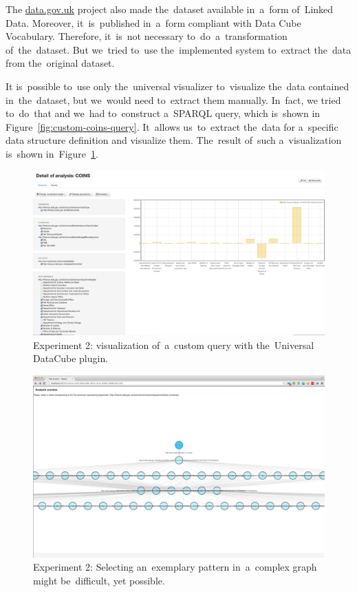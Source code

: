 The \url{data.gov.uk} project also made the~dataset available in~a~form of~Linked 
Data. Moreover, it~is~published in~a~form compliant with Data Cube Vocabulary.
Therefore, it~is~not necessary to~do~a~transformation of~the~dataset. But we~tried to~use the~implemented system to~extract the~data from the~original 
dataset.

It is~possible to~use only the~universal visualizer to~visualize the~data 
contained in~the~dataset, but we~would need to~extract them manually. In~fact, 
we tried to~do~that and we~had to~construct a~SPARQL query, which is~shown in
Figure~\ref{fig:custom-coins-query}. It~allows us~to~extract the~data for a~specific data structure 
definition and visualize them. The~result of~such a~visualization is~shown in~Figure~\ref{fig:payola-exp-02}. 

\begin{figure}
  \centering
  \includegraphics[width=140mm]{img/payola-exp-02.png}
  \caption{Experiment 2: visualization of~a~custom query with the~Universal DataCube plugin.}
  \label{fig:payola-exp-02}
\end{figure}

\begin{figure}
  \centering
  \includegraphics[width=140mm]{img/payola-exp-02-pattern.png}
  \caption{Experiment 2: Selecting an~exemplary pattern in~a~complex graph might be~difficult, yet possible.}
  \label{fig:payola-exp-02-pattern}
\end{figure}

